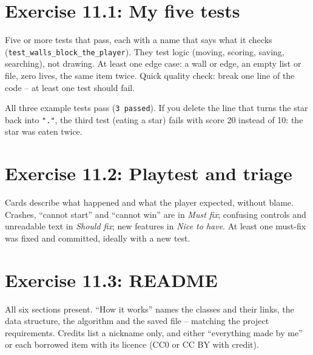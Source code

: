 
\section{Exercise 11.1: My five tests}
\begin{answer}
Five or more tests that pass, each with a name that says what it checks (\texttt{test\_walls\_block\_the\_player}). They test logic (moving, scoring, saving, searching), not drawing. At least one edge case: a wall or edge, an empty list or file, zero lives, the same item twice. Quick quality check: break one line of the code -- at least one test should fail.
\end{answer}
\begin{answer}
All three example tests pass (\texttt{3 passed}). If you delete the line that turns the star back into \texttt{"."}, the third test (eating a star) fails with score 20 instead of 10: the star was eaten twice.
\end{answer}

\section{Exercise 11.2: Playtest and triage}
\begin{answer}
Cards describe what happened and what the player expected, without blame. Crashes, \enquote{cannot start} and \enquote{cannot win} are in \emph{Must fix}; confusing controls and unreadable text in \emph{Should fix}; new features in \emph{Nice to have}. At least one must-fix was fixed and committed, ideally with a new test.
\end{answer}

\section{Exercise 11.3: README}
\begin{answer}
All six sections present. \enquote{How it works} names the classes and their links, the data structure, the algorithm and the saved file -- matching the project requirements. Credits list a nickname only, and either \enquote{everything made by me} or each borrowed item with its licence (CC0 or CC BY with credit).
\end{answer}


